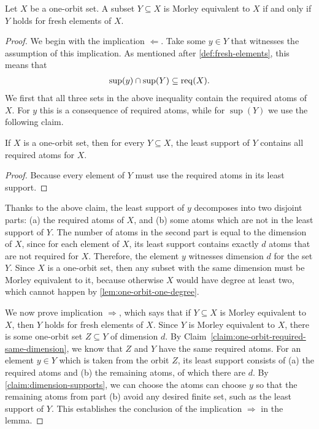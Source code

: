 \begin{lemma}\label{lem:large-subsets-fresh-elements}
    Let $X$ be a one-orbit set. A subset $Y \subseteq X$ is Morley equivalent to $X$ if and only if $Y$ holds for fresh elements of $X$.
\end{lemma}
\begin{proof}
     We begin with the  implication $\Leftarrow$. Take some $y \in Y$ that witnesses the assumption of this implication. As mentioned after \cref{def:fresh-elements}, this means that 
    \begin{align*}
    \sup(y) \cap \sup(Y) \subseteq \operatorname{req}(X).
    \end{align*}
    We first that all three sets in the above inequality contain the required atoms of $X$. For $y$ this is a consequence of required atoms, while for $\sup(Y)$ we use the following claim.
    \begin{claim}
        If $X$ is a one-orbit set, then for every $Y \subseteq X$, the least support of $Y$ contains all required atoms for $X$.  
    \end{claim}
    \begin{proof}
        Because every element of $Y$ must use the required atoms in its least support.
    \end{proof}
    Thanks to the above claim,  the least support of $y$ decomposes into two disjoint parts: (a) the required atoms of $X$, and (b) some atoms which are not in the least support of $Y$. The number of atoms in the second part is equal to the dimension of $X$, since for each element of $X$, its least support contains exactly $d$ atoms that are not required for $X$. Therefore, the element $y$ witnesses dimension $d$ for the set $Y$. Since $X$ is a one-orbit set, then any subset with the same dimension must be Morley equivalent to it, because otherwise $X$ would have degree at least two, which cannot happen by \cref{lem:one-orbit-one-degree}.

    We now prove implication $\Rightarrow$, which says that if $Y \subseteq X$ is Morley equivalent to $X$, then $Y$ holds for fresh elements of $X$.  Since $Y$ is Morley equivalent to $X$, there is some one-orbit set $Z \subseteq Y$ of dimension $d$. By Claim~\ref{claim:one-orbit-required-same-dimension}, we know that $Z$ and $Y$ have the same required atoms. For an element $y \in Y$ which is taken from the orbit $Z$, its least support consists of (a) the required atoms and (b) the remaining atoms, of which there are $d$. By \cref{claim:dimension-supports}, we can choose the atoms can choose $y$ so that the remaining atoms from part (b)  avoid any desired finite set, such as the least support of $Y$. This establishes the conclusion of the implication $\Rightarrow$ in the lemma. 
\end{proof}






